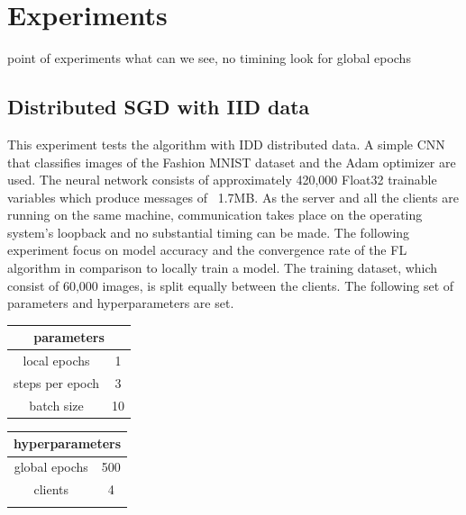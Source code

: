 


\section{Experiments}
point of experiments
what can we see, no timining look for global epochs
\subsection{Distributed SGD with IID data}
This experiment tests the algorithm with IDD distributed data. A simple CNN that classifies images of the Fashion MNIST dataset and the Adam optimizer are used. The neural network consists of approximately 420,000 Float32 trainable variables which produce messages of ~1.7MB. As the server and all the clients are running on the same machine, communication takes place on the operating system's loopback and no substantial timing can be made. The following experiment focus on model accuracy and the convergence rate of the FL algorithm in comparison to locally train a model. The training dataset, which consist of 60,000 images, is split equally between the clients. The following set of parameters and hyperparameters are set.

\begin{center}
    \begin{tabular}{|c|c|}
        \hline
        \multicolumn{2}{|c|}{ parameters } \\
        \hline\hline
        local epochs & 1 \\
        \hline
        steps per epoch & 3 \\
        \hline
        batch size & 10 \\
        \hline
    \end{tabular}
    \quad
    \begin{tabular}{|c|c|}
        \hline
        \multicolumn{2}{|c|}{ hyperparameters } \\
        \hline\hline
        global epochs & 500 \\
        \hline
        clients & 4 \\
        \hline
        \multicolumn{2}{c}{ } \\
    \end{tabular}
\end{center}

